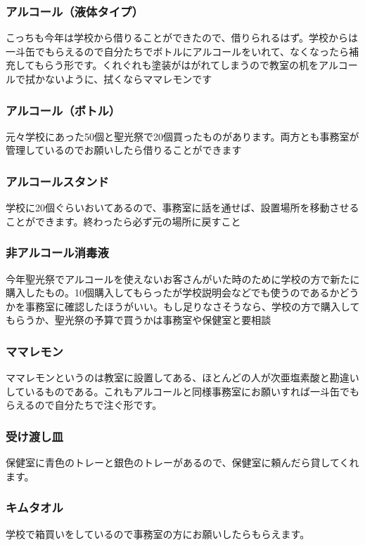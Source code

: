 \documentclass[dvipdfmx,jb5]{jarticle}
\begin{document}
\subsubsection{アルコール（液体タイプ）}
こっちも今年は学校から借りることができたので、借りられるはず。学校からは一斗缶でもらえるので自分たちでボトルにアルコールをいれて、なくなったら補充してもらう形です。くれぐれも塗装がはがれてしまうので教室の机をアルコールで拭かないように、拭くならママレモンです

\subsubsection{アルコール（ボトル）}
元々学校にあった50個と聖光祭で20個買ったものがあります。両方とも事務室が管理しているのでお願いしたら借りることができます

\subsubsection{アルコールスタンド}
学校に20個ぐらいおいてあるので、事務室に話を通せば、設置場所を移動させることができます。終わったら必ず元の場所に戻すこと

\subsubsection{非アルコール消毒液}
今年聖光祭でアルコールを使えないお客さんがいた時のために学校の方で新たに購入したもの。10個購入してもらったが学校説明会などでも使うのであるかどうかを事務室に確認したほうがいい。もし足りなさそうなら、学校の方で購入してもらうか、聖光祭の予算で買うかは事務室や保健室と要相談

\subsubsection{ママレモン}
ママレモンというのは教室に設置してある、ほとんどの人が次亜塩素酸と勘違いしているものである。これもアルコールと同様事務室にお願いすれば一斗缶でもらえるので自分たちで注ぐ形です。

\subsubsection{受け渡し皿}
保健室に青色のトレーと銀色のトレーがあるので、保健室に頼んだら貸してくれます。

\subsubsection{キムタオル}
学校で箱買いをしているので事務室の方にお願いしたらもらえます。
\end{document}
